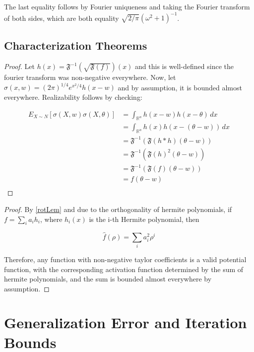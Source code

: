 \documentclass{article}
\newcommand{\R}{{\mathbb{R}}}
\begin{document}
The last equality follows by Fourier uniqueness and taking the Fourier transform of both sides, which are both equality $\sqrt{2/\pi}(\omega^2+1)^{-1}$. 



\subsection{Characterization Theorems}

\tranReal*

\begin{proof}
Let $h(x) = \mathfrak{F}^{-1}(\sqrt{\mathfrak{F}(f)})(x)$ and this is well-defined since the fourier transform was non-negative everywhere. Now, let $\sigma(x,w) = (2\pi)^{1/4}e^{x^2/4}h(x-w)$ and by assumption, it is bounded almost everywhere. Realizability follows by checking:

\begin{align*}
    E_{X \sim N}[\sigma(X,w)\sigma(X,\theta)]  &= \int_{\R^n} h(x-w)h(x-\theta) \, dx \\
    &= \int_{\R^n} h(x)h(x-(\theta-w)) \, dx \\
    &= \mathfrak{F}^{-1}(\mathfrak{F}(h\ast h)(\theta -w)) \\
    &= \mathfrak{F}^{-1}(\mathfrak{F}(h)^2(\theta - w)) \\
    &= \mathfrak{F}^{-1}(\mathfrak{F}(f)(\theta - w)) \\
    &= f(\theta - w) \\
\end{align*}



\end{proof}




\rotReal*

\begin{proof}
By \ref{rotLem} and due to the orthogonality of hermite polynomials, if $f = \sum_i a_i h_i$, where $h_i(x)$ is the i-th Hermite polynomial, then

\[\widehat{f}(\rho) = \sum_{i} a_i^2 \rho^i\]

Therefore, any function with non-negative taylor coefficients is a valid potential function, with the corresponding activation function determined by the sum of hermite polynomials, and the sum is bounded almost everywhere by assumption.
\end{proof}



\section{Generalization Error and Iteration Bounds}
\label{finite}
 
\end{document}
